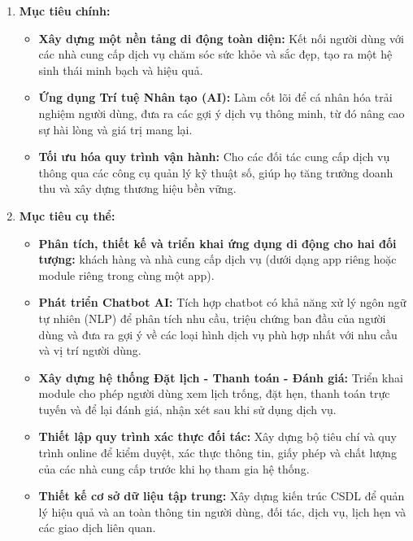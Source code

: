 \begin{enumerate}
    \item \textbf{Mục tiêu chính:}
        \begin{itemize}
            \item \textbf{Xây dựng một nền tảng di động toàn diện:} Kết nối người dùng với các nhà cung cấp dịch vụ chăm sóc sức khỏe và sắc đẹp, tạo ra một hệ sinh thái minh bạch và hiệu quả.
            \item \textbf{Ứng dụng Trí tuệ Nhân tạo (AI):} Làm cốt lõi để cá nhân hóa trải nghiệm người dùng, đưa ra các gợi ý dịch vụ thông minh, từ đó nâng cao sự hài lòng và giá trị mang lại.
            \item \textbf{Tối ưu hóa quy trình vận hành:} Cho các đối tác cung cấp dịch vụ thông qua các công cụ quản lý kỹ thuật số, giúp họ tăng trưởng doanh thu và xây dựng thương hiệu bền vững.
        \end{itemize}

    \item \textbf{Mục tiêu cụ thể:}
        \begin{itemize}
            \item \textbf{Phân tích, thiết kế và triển khai ứng dụng di động cho hai đối tượng:} khách hàng và nhà cung cấp dịch vụ (dưới dạng app riêng hoặc module riêng trong cùng một app).
            \item \textbf{Phát triển Chatbot AI:} Tích hợp chatbot có khả năng xử lý ngôn ngữ tự nhiên (NLP) để phân tích nhu cầu, triệu chứng ban đầu của người dùng và đưa ra gợi ý về các loại hình dịch vụ phù hợp nhất với nhu cầu và vị trí người dùng.
            \item \textbf{Xây dựng hệ thống Đặt lịch - Thanh toán - Đánh giá:} Triển khai module cho phép người dùng xem lịch trống, đặt hẹn, thanh toán trực tuyến và để lại đánh giá, nhận xét sau khi sử dụng dịch vụ.
            \item \textbf{Thiết lập quy trình xác thực đối tác:} Xây dựng bộ tiêu chí và quy trình online để kiểm duyệt, xác thực thông tin, giấy phép và chất lượng của các nhà cung cấp trước khi họ tham gia hệ thống.
            \item \textbf{Thiết kế cơ sở dữ liệu tập trung:} Xây dựng kiến trúc CSDL để quản lý hiệu quả và an toàn thông tin người dùng, đối tác, dịch vụ, lịch hẹn và các giao dịch liên quan.
        \end{itemize}
\end{enumerate}

